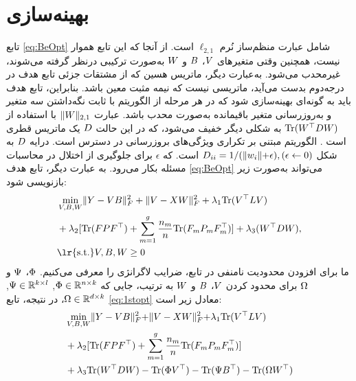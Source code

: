\section{بهینه‌سازی}\label{OPT} 
تابع \eqref{eq:BeOpt} شامل عبارت منظم‌ساز نُرم $\ell_{2,1} $ است. از آنجا که این تابع هموار نیست، همچنین وقتی متغیرهای $\boldmath{V}$، $\boldmath{B}$ و $\boldmath{W}$ به‌صورت ترکیبی درنظر گرفته می‌شوند، غیرمحدب می‌شود. به‌عبارت دیگر، ماتریس هسین که از مشتقات جزئی تابع هدف در درجه‌دوم بدست می‌آید، ماتریسی نیست که نیمه مثبت معین باشد. بنابراین، تابع هدف باید به گونه‌ای بهینه‌سازی شود که در هر مرحله از الگوریتم با ثابت نگه‌داشتن سه متغیر و به‌روزرسانی متغیر باقیمانده به‌صورت محدب باشد. عبارت $\lVert\boldmath{W}\rVert_{2,1}$ با استفاده از $\mathrm{Tr} (\boldmath{W^\top DW})$ به شکلی دیگر خفیف می‌شود، که در این حالت $\boldmath{D}$ یک ماتریس قطری است \cite{hu2020multi}. الگوریتم مبتنی بر تکراری ویژگی‌های بروزرسانی در دسترس است. درایه $\boldmath{D}$ به شکل $D_{ii} = 1/(\lVert \boldmath{w}_i\lVert+\epsilon),(\epsilon\leftarrow0)$ است.
که $\epsilon$ برای جلوگیری از اختلال در محاسبات مسئله بکار می‌رود. به عبارت دیگر، تابع هدف \eqref{eq:BeOpt} می‌تواند به‌صورت زیر بازنویسی شود:
\begin{align}\label{eq:1stopt}
	&\min_{\boldmath{V},\boldmath{B},\boldmath{W}}\lVert\boldmath{Y}-\boldmath{V}\boldmath{B}\rVert^2_F+\lVert\boldmath{V}-\boldmath{X}\boldmath{W}\rVert^2_F+\lambda_1{\mathrm{Tr}\boldmath{({V}^\top{LV})}}\nonumber \\
	&+\lambda_2[\mathrm{Tr}(\boldmath{FP}\boldmath{F}^\top)+\sum_{m=1}^{g}\frac{n_m}{n}\mathrm{Tr}(\boldmath{F}_m\boldmath{P}_m\boldmath{F}^\top_m) ]+ \lambda_3(\boldmath{W}^\top \boldmath{DW}),\nonumber\\
	& {\text{\lr{s.t.}}}\boldmath{V},\boldmath{B},\boldmath{W}\geq 0 
\end{align}
ما برای افزودن محدودیت نامنفی در تابع، ضرایب لاگرانژی را معرفی می‌کنیم. 
$\boldmath{\Phi}$، $\boldmath{\Psi}$
و $\boldmath{\Omega}$ برای محدود کردن $\boldmath{V}$، $\boldmath{B}$ و $\boldmath{W}$ به ترتیب، جایی که $\boldmath{\Phi} \in\mathbb {R}^{n \times k}$, $\boldmath{\Psi} \in\mathbb{R}^{k \times l}$, $\boldmath{\Omega} \in\mathbb{R}^ {d \times k}$، در نتیجه، تابع \eqref{eq:1stopt} معادل زیر است:
\begin{align}\label{eq:2ndopt}
	&\min_{\boldmath{V}, \boldmath{B}, \boldmath{W}}\lVert\boldmath{Y}-\boldmath{V}\boldmath{B}\lVert^2_F + \lVert\boldmath{V}-\boldmath{X}\boldmath{W}\lVert^2_F+ \lambda_1\mathrm{Tr}(\boldmath{V}^\top \boldmath{LV})\nonumber \\
	&+\lambda_2[\mathrm{Tr}(\boldmath{F}\boldmath{P}\boldmath{F}^\top) + \sum_{m=1}^{g}\frac{n_m}{n}\mathrm{Tr}(\boldmath{F}_m\boldmath{P}_m\boldmath{F}_m^\top)]\nonumber\\
	&+\lambda_3\mathrm{Tr}(\boldmath{W}^\top \boldmath{D}\boldmath{W})- \mathrm{Tr}(\boldmath{\Phi}\boldmath{V}^\top)    -\mathrm{Tr}(\boldmath{\Psi}\boldmath{B}^\top)-\mathrm{Tr}(\boldmath{\Omega}\boldmath{W}^\top)\nonumber\\
\end{align}
